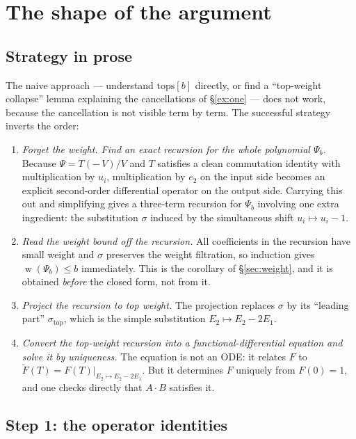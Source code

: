 \documentclass[10pt]{article}
\theoremstyle{plain}
\theoremstyle{definition}
\newcommand{\wt}{\operatorname{w}}
\newcommand{\sigtop}{\sigma_{\mathrm{top}}}
\begin{document}
\section{The shape of the argument}\label{sec:argument}

\subsection{Strategy in prose}

The naive approach --- understand $\mathrm{tops}[b]$ directly, or find a ``top-weight
collapse'' lemma explaining the cancellations of \S\ref{ex:one} --- does not work, because
the cancellation is not visible term by term. The successful strategy inverts the order:

\begin{enumerate}
\item[(1)] \emph{Forget the weight. Find an exact recursion for the whole polynomial
$\Psi_b$.} Because $\Psi=T(-\,V)/V$ and $T$ satisfies a clean commutation identity with
multiplication by $u_i$, multiplication by $e_2$ on the input side becomes an explicit
second-order differential operator on the output side. Carrying this out and simplifying
gives a three-term recursion for $\Psi_b$ involving one extra ingredient: the substitution
$\sigma$ induced by the simultaneous shift $u_i\mapsto u_i-1$.
\item[(2)] \emph{Read the weight bound off the recursion.} All coefficients in the recursion
have small weight and $\sigma$ preserves the weight filtration, so induction gives
$\wt(\Psi_b)\le b$ immediately. This is the corollary of \S\ref{sec:weight}, and it is
obtained \emph{before} the closed form, not from it.
\item[(3)] \emph{Project the recursion to top weight.} The projection replaces $\sigma$ by
its ``leading part'' $\sigtop$, which is the simple substitution $E_2\mapsto E_2-2E_1$.
\item[(4)] \emph{Convert the top-weight recursion into a functional-differential equation
and solve it by uniqueness.} The equation is not an ODE: it relates $F$ to
$\widetilde F(T)=F(T)|_{E_2\mapsto E_2-2E_1}$. But it determines $F$ uniquely from
$F(0)=1$, and one checks directly that $A\cdot B$ satisfies it.
\end{enumerate}

\subsection{Step 1: the operator identities}
\end{document}

